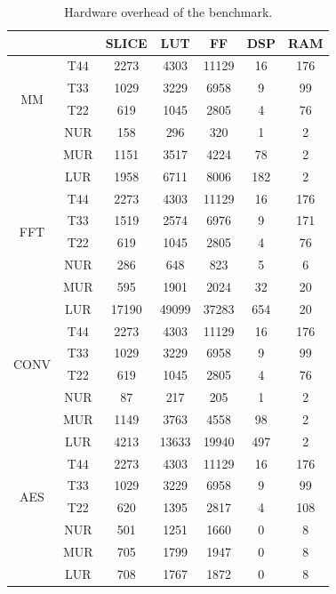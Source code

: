 \begin{table}[h]
\vspace{-1em}
\caption{Hardware overhead of the benchmark.}
\label{tab:overhead}
\centering
\small
\begin{tabular}{|c|c|c|c|c|c|c|}
\hline
\multicolumn{2}{|c|}{} & SLICE & LUT & FF & DSP & RAM\\
\hline
\multirow{4}{*}{MM} & T44 & 2273 & 4303 & 11129 & 16 & 176\\
\cline{2-7}
& T33 & 1029 & 3229 & 6958 & 9 & 99\\
\cline{2-7}
& T22 & 619 & 1045 & 2805 & 4 & 76\\
\cline{2-7}
& NUR & 158 & 296 & 320 & 1 & 2\\
\cline{2-7}
& MUR & 1151 & 3517 & 4224 & 78 & 2\\
\cline{2-7}
& LUR & 1958 & 6711 & 8006 & 182 &2\\
\hline

\multirow{4}{*}{FFT} & T44 & 2273 & 4303 & 11129 & 16 & 176\\
\cline{2-7}
& T33 & 1519 & 2574 & 6976 & 9 & 171\\
\cline{2-7}
& T22 & 619 & 1045 & 2805 & 4 & 76\\
\cline{2-7}

& NUR & 286 & 648 & 823 & 5 & 6\\
\cline{2-7}
& MUR & 595 & 1901 & 2024 & 32 & 20\\
\cline{2-7}
& LUR &	17190 &	49099 &	37283 &	654 & 20\\
\hline

\multirow{4}{*}{CONV} & T44 & 2273 & 4303 & 11129 & 16 & 176\\
\cline{2-7}
& T33 & 1029 & 3229 & 6958 & 9 & 99\\
\cline{2-7}
& T22 & 619 & 1045 & 2805 & 4 & 76\\
\cline{2-7}

& NUR &	87 & 217 & 205 & 1 & 2\\
\cline{2-7}
& MUR & 1149 & 3763 & 4558 & 98 & 2\\
\cline{2-7}
& LUR & 4213 & 13633 & 19940 & 497 & 2\\
\hline

\multirow{4}{*}{AES} & T44 & 2273 & 4303 & 11129 & 16 & 176\\
\cline{2-7}
& T33 & 1029 & 3229 & 6958 & 9 & 99\\
\cline{2-7}
& T22 & 620 & 1395 & 2817 & 4 & 108\\
\cline{2-7}

& NUR &	501 & 1251 & 1660 & 0 & 8\\
\cline{2-7}
& MUR &	705 & 1799 & 1947 & 0 &	8\\
\cline{2-7}
& LUR & 708 & 1767 & 1872 & 0 & 8\\
\hline


\end{tabular}
\end{table}

